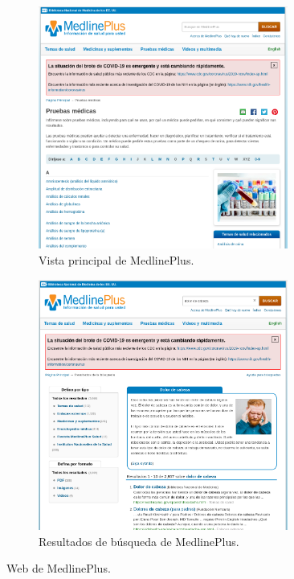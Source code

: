 \begin{figure}[h!]
    \begin{subfigure}[b]{0.45\linewidth}
    	\centering
		\includegraphics[width=0.9\textwidth]{images/MedlinePlus.png}
		\caption{Vista principal de MedlinePlus.}
		\label{fig:medlineplus1}
	\end{subfigure}
	\begin{subfigure}[b]{0.45\linewidth} 
		\centering
		\includegraphics[width=0.9\textwidth]{images/MedlinePlus2.png}
		\caption{Resultados de búsqueda de MedlinePlus.}
		\label{fig:medlineplus2}
	\end{subfigure}
	\caption{Web de MedlinePlus.}
	\label{fig:medlineplus}
\end{figure}

